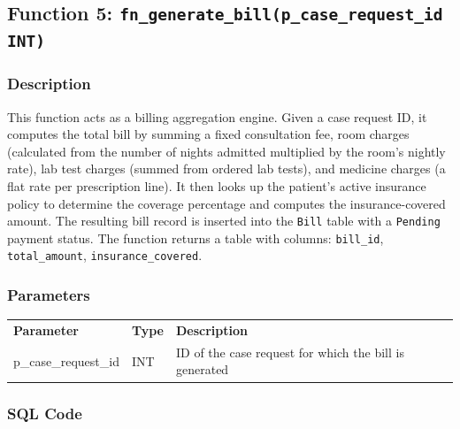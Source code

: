 \documentclass{article}
\newcommand{\theadcell}{\color{white}\bfseries}
\begin{document}

\vspace{1em}

\subsection{Function 5: \texttt{fn\_generate\_bill(p\_case\_request\_id INT)}}

\subsubsection{Description}
This function acts as a billing aggregation engine. Given a case request ID, it computes the total bill by summing a fixed consultation fee, room charges (calculated from the number of nights admitted multiplied by the room's nightly rate), lab test charges (summed from ordered lab tests), and medicine charges (a flat rate per prescription line). It then looks up the patient's active insurance policy to determine the coverage percentage and computes the insurance-covered amount. The resulting bill record is inserted into the \texttt{Bill} table with a \texttt{Pending} payment status. The function returns a table with columns: \texttt{bill\_id}, \texttt{total\_amount}, \texttt{insurance\_covered}.

\subsubsection{Parameters}

\begin{center}
\begin{tabular}{L{4.5cm} L{2.5cm} L{6.5cm}}
   \theadcell Parameter & \theadcell Type & \theadcell Description \\
   p\_case\_request\_id & INT & ID of the case request for which the bill is generated \\
\end{tabular}
\end{center}

\subsubsection{SQL Code}
\end{document}
